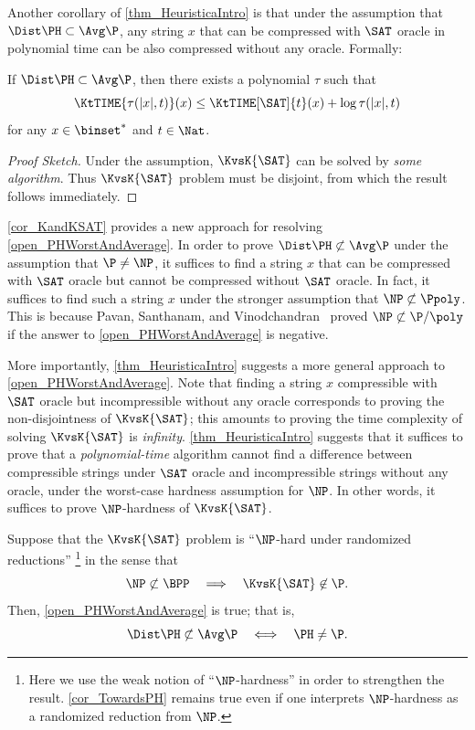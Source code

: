 \documentclass{toc}
\begin{document}
Another corollary of \cref{thm_HeuristicaIntro} is
that
under the assumption that $\Dist\PH \subset \Avg\P$,
any string $x$ that can be compressed with $\SAT$ oracle in polynomial time
can be also compressed without any oracle.
Formally:
\begin{corollary}
  \label{cor_KandKSAT}
  If $\Dist\PH \subset \Avg\P$,
  then
  there exists a polynomial $\tau$ such that
  $$\KtTIME{\tau(|x|, t)}(x) \le \KtTIME[\SAT]{t}(x) + \log \tau(|x|, t)$$
  for any $x \in \binset^*$ and $t \in \Nat$.
\end{corollary}
\begin{proof}
  [Proof Sketch]
  Under the assumption, $\KvsK{\SAT}$
  can be solved by \emph{some algorithm}.
  Thus $\KvsK{\SAT}$ problem must be disjoint, from which the result follows immediately.
\end{proof}

%
%
%
\cref{cor_KandKSAT} provides a new approach for resolving \cref{open_PHWorstAndAverage}.
In order to prove $\Dist\PH \not\subset \Avg\P$ under the assumption that $\P \neq \NP$,
it suffices to find a string $x$ that can be compressed with $\SAT$ oracle
but cannot be compressed without $\SAT$ oracle.
In fact, it suffices to find such a string $x$ under the stronger assumption that $\NP \not\subset \Ppoly$.
%
%
%
%
This is because Pavan, Santhanam, and Vinodchandran~\cite{PavanSV06_fsttcs_conf}
proved
$\NP \not\subset \P/\poly$ if
%
%
the answer to \cref{open_PHWorstAndAverage} is negative.  %

More importantly, \cref{thm_HeuristicaIntro} suggests a more general approach to \cref{open_PHWorstAndAverage}.
%
Note that finding a string $x$ compressible with $\SAT$ oracle but incompressible
without any oracle
corresponds to proving the non-disjointness of $\KvsK{\SAT}$;
this amounts to proving
the time complexity of solving $\KvsK{\SAT}$
is \emph{infinity}.
\cref{thm_HeuristicaIntro}
suggests that
it suffices to prove that
a \emph{polynomial-time} algorithm cannot find a difference between
compressible strings under $\SAT$ oracle
and
incompressible strings without any oracle,
under the worst-case hardness assumption for $\NP$.
In other words, %
it suffices to prove $\NP$-hardness of $\KvsK{\SAT}$.

\begin{corollary}
  \label{cor_TowardsPH}
  Suppose that the $\KvsK{\SAT}$ problem is ``$\NP$-hard
  under randomized reductions''%
  \footnote{
    Here we use the weak notion of ``$\NP$-hardness'' in order to strengthen the result.
    \cref{cor_TowardsPH} remains true even if one interprets $\NP$-hardness as a randomized reduction from $\NP$.
  }
  in the sense that
  $$
    \NP \not\subset \BPP
    \quad
    \Longrightarrow
    \quad
    \KvsK{\SAT} \not\in \P.
  $$
  Then,
  \cref{open_PHWorstAndAverage} is true; that is,
  $$
    \Dist\PH \not\subset \Avg\P
    \quad
    \Longleftrightarrow
    \quad
    \PH \neq \P.
  $$
\end{corollary}
\end{document}
